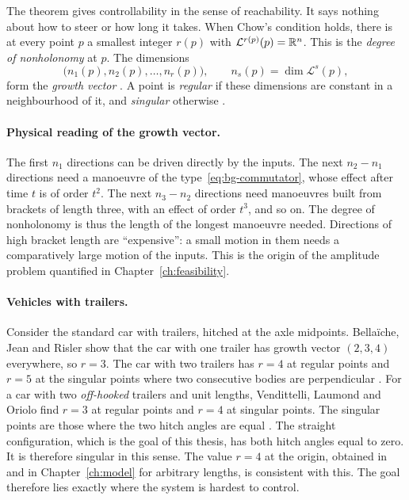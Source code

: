 The theorem gives controllability in the sense of reachability. It says nothing
about how to steer or how long it takes. When Chow's condition holds, there is
at every point $p$ a smallest integer $r(p)$ with $\mathcal L^{r(p)}(p)=\mathbb{R}^n$.
This is the \emph{degree of nonholonomy} at $p$. The dimensions
\begin{equation}
  \bigl(n_1(p),n_2(p),\dots,n_r(p)\bigr),\qquad n_s(p)=\dim\mathcal L^s(p),
\end{equation}
form the \emph{growth vector} \cite{bellaiche2005}. A point is \emph{regular}
if these dimensions are constant in a neighbourhood of it, and \emph{singular}
otherwise \cite{bellaiche2005}.

\paragraph{Physical reading of the growth vector.}
The first $n_1$ directions can be driven directly by the inputs. The next
$n_2-n_1$ directions need a manoeuvre of the type~\eqref{eq:bg-commutator},
whose effect after time $t$ is of order $t^2$. The next $n_3-n_2$ directions
need manoeuvres built from brackets of length three, with an effect of order
$t^3$, and so on. The degree of nonholonomy is thus the length of the
longest manoeuvre needed. Directions of high bracket length are
``expensive'': a small motion in them needs a comparatively large motion
of the inputs. This is the origin of the amplitude problem quantified in
Chapter~\ref{ch:feasibility}.

\paragraph{Vehicles with trailers.}
Consider the standard car with trailers, hitched at the axle midpoints.
Bella\"iche, Jean and Risler show that the car with one trailer has growth
vector $(2,3,4)$ everywhere, so $r=3$. The car with two trailers has $r=4$ at
regular points and $r=5$ at the singular points where two consecutive bodies are
perpendicular \cite{bellaiche2005}. For a car with two \emph{off-hooked}
trailers and unit lengths, Vendittelli, Laumond and Oriolo find $r=3$ at
regular points and $r=4$ at singular points. The singular points are those
where the two hitch angles are equal \cite{vendittelli1998}. The straight
configuration, which is the goal of this thesis, has both hitch angles equal to
zero. It is therefore singular in this sense. The value $r=4$ at the origin,
obtained in~\cite{zuyev2024} and in Chapter~\ref{ch:model} for arbitrary lengths,
is consistent with this. The goal therefore lies exactly where the system is
hardest to control.

